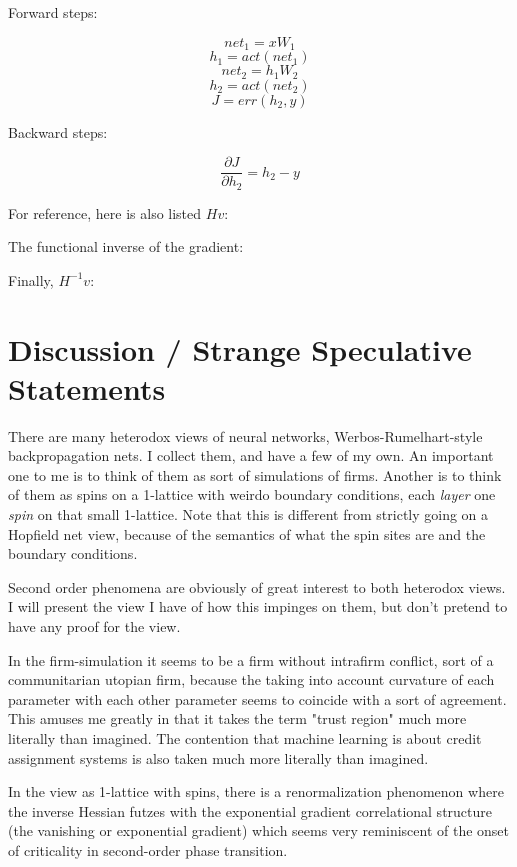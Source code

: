 \documentclass{article}
\begin{document}
Forward steps:

$$ net_1 = xW_1 $$
$$ h_1 = act(net_1) $$
$$ net_2 = h_1W_2 $$
$$ h_2 = act(net_2) $$
$$ J = err(h_2, y) $$

Backward steps:

$$ \frac{\partial J}{\partial h_2} = h_2 - y $$

For reference, here is also listed $Hv$:


The functional inverse of the gradient:

Finally, $H^{-1}v$:


\section{Discussion / Strange Speculative Statements}

There are many heterodox views of neural networks, Werbos-Rumelhart-style backpropagation nets. I collect them, and have a few of my own. An important one to me is to think of them as sort of simulations of firms. Another is to think of them as spins on a 1-lattice with weirdo boundary conditions, each \textit{layer} one \textit{spin} on that small 1-lattice. Note that this is different from strictly going on a Hopfield net view, because of the semantics of what the spin sites are and the boundary conditions.

Second order phenomena are obviously of great interest to both heterodox views. I will present the view I have of how this impinges on them, but don't pretend to have any proof for the view.

In the firm-simulation it seems to be a firm without intrafirm conflict, sort of a communitarian utopian firm, because the taking into account curvature of each parameter with each other parameter seems to coincide with a sort of agreement. This amuses me greatly in that it takes the term "trust region" much more literally than imagined. The contention that machine learning is about credit assignment systems is also taken much more literally than imagined.

In the view as 1-lattice with spins, there is a renormalization phenomenon where the inverse Hessian futzes with the exponential gradient correlational structure (the vanishing or exponential gradient) which seems very reminiscent of the onset of criticality in second-order phase transition.
\end{document}
